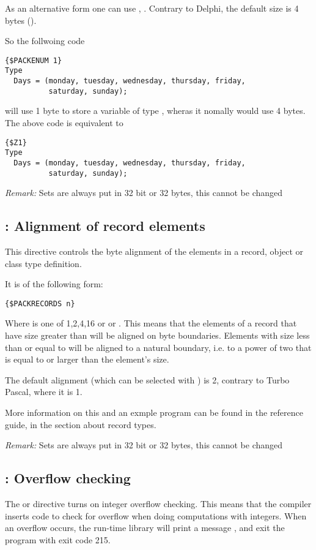 \documentclass{report}
\begin{document}
As an alternative form one can use ,  
. Contrary to Delphi, the default size is 4 bytes
().

So the follwoing code
\begin{verbatim}
{$PACKENUM 1}
Type
  Days = (monday, tuesday, wednesday, thursday, friday, 
          saturday, sunday);
\end{verbatim}
will use 1 byte to store a variable of type , wheras it nomally
would use 4 bytes. The above code is equivalent to
\begin{verbatim}
{$Z1}
Type
  Days = (monday, tuesday, wednesday, thursday, friday, 
          saturday, sunday);
\end{verbatim}

{\em Remark:}
Sets are always put in 32 bit or 32 bytes, this cannot be changed

\subsection{ : Alignment of record elements}

This directive controls the byte alignment of the elements in a record,
object or class type definition.

It is of the following form:
\begin{verbatim}
{$PACKRECORDS n}
\end{verbatim}

Where  is one of 1,2,4,16 or  or . 
This means that the elements of a record that have size greater than 
will be aligned on  byte boundaries. Elements with size less than or
equal to  will be aligned to a natural boundary, i.e. to a power of
two that is equal to or larger than the element's size.

The default alignment (which can be selected with ) is 2, 
contrary to Turbo Pascal, where it is 1.

More information on this and an exmple program can be found in the reference 
guide, in the section about record types.

{\em Remark:}
Sets are always put in 32 bit or 32 bytes, this cannot be changed

\subsection{ : Overflow checking}
The  or  directive turns on 
integer overflow checking. This means that the compiler inserts code 
to check for overflow when doing computations with integers.
When an overflow occurs, the run-time library will print a message
, and exit the program with exit code 215.
\end{document}
